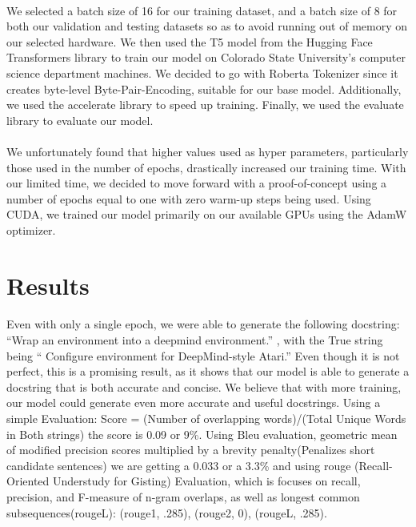 \documentclass[12pt]{article}
\begin{document}
	\paragraph{} We selected a batch size of 16 for our training dataset, and a batch size of 8 for both our validation and testing datasets so as to avoid running out of memory on our selected hardware. We then used the T5 model from the Hugging Face Transformers library to train our model on Colorado State University's computer science department machines. We decided to go with Roberta Tokenizer since it creates byte-level Byte-Pair-Encoding, suitable for our base model. Additionally, we used the accelerate library to speed up training. Finally, we used the evaluate library to evaluate our model.
	\paragraph{} We unfortunately found that higher values used as hyper parameters, particularly those used in the number of epochs, drastically increased our training time. With our limited time, we decided to move forward with a proof-of-concept using a number of epochs equal to one with zero warm-up steps being used. Using CUDA, we trained our model primarily on our available GPUs using the AdamW optimizer.

	\section{Results}
	\paragraph{} Even with only a single epoch, we were able to generate the following docstring: “Wrap an environment into a deepmind environment.” , with the True string being “ Configure environment for DeepMind-style Atari.” Even though it is not perfect, this is a promising result, as it shows that our model is able to generate a docstring that is both accurate and concise. We believe that with more training, our model could generate even more accurate and useful docstrings. Using a simple Evaluation: Score = (Number of overlapping words)/(Total Unique Words in Both strings) the score is 0.09 or 9\%. Using Bleu evaluation, geometric mean of modified precision scores multiplied by a brevity penalty(Penalizes short candidate sentences) we are getting a 0.033 or a 3.3\% and using rouge (Recall-Oriented Understudy for Gisting) Evaluation, which is focuses on recall, precision, and F-measure of n-gram overlaps, as well as longest common subsequences(rougeL): (rouge1, .285), (rouge2, 0), (rougeL, .285).
\end{document}
